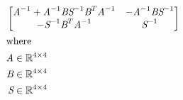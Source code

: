 \documentclass[12pt]{article}
\begin{document}
\begin{center}
\resizebox{\textwidth}{!} 
{
\begin{minipage}[c]{\textwidth}
\begin{align*}
 \omit \span \begin{bmatrix}
\textit{A}^{-1} + \textit{A}^{-1}\textit{B}\textit{S}^{-1}\textit{B}^T\textit{A}^{-1} & -\textit{A}^{-1}\textit{B}\textit{S}^{-1}\\
-\textit{S}^{-1}\textit{B}^T\textit{A}^{-1} & \textit{S}^{-1}\\
\end{bmatrix} \\
\intertext{where} 
\textit{A} & \in \mathbb{R}^{ 4 \times 4 } \\
\textit{B} & \in \mathbb{R}^{ 4 \times 4 } \\
\textit{S} & \in \mathbb{R}^{ 4 \times 4 } \\
\\
\end{align*}
\end{minipage}
}
\end{center}
\end{document}
